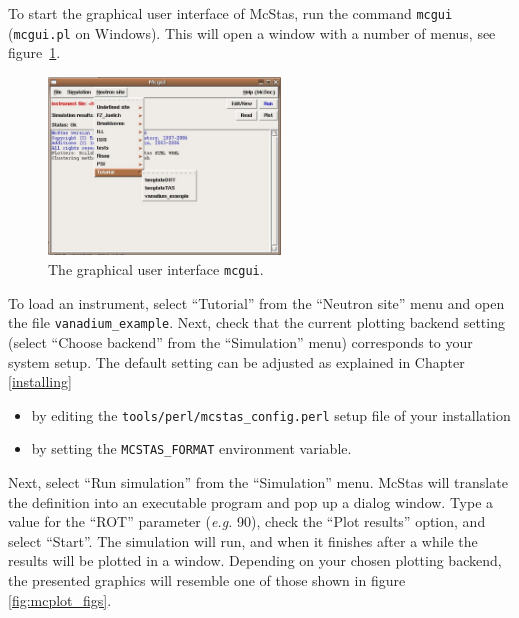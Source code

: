 To start the graphical user interface of McStas, run the command
\verb+mcgui+ (\verb+mcgui.pl+ on Windows). This will open a window
with a number of menus,
see figure~\ref{fig:mcgui}. 
\begin{figure}[htb!]
  \begin{center}
    \includegraphics[width=0.55\textwidth]{figures/mcgui.eps}
  \end{center}
\caption{The graphical user interface \texttt{mcgui}.}
\label{fig:mcgui}
\end{figure}
\label{p:neutronsite}
To load an instrument, select ``Tutorial'' from the ``Neutron site''
menu and open the file \verb+vanadium_example+. Next, check that the current plotting backend setting
(select ``Choose backend'' from the ``Simulation'' menu) corresponds
to your system setup. The default setting can be adjusted as explained in Chapter \ref{installing}
\begin{itemize}
\item{by editing
the \verb+tools/perl/mcstas_config.perl+ setup file of your
installation}
\item{by setting the \verb+MCSTAS_FORMAT+ environment
variable.}
\end{itemize} 
Next, select ``Run simulation'' from the ``Simulation'' menu.
McStas will translate the definition into an executable program and pop
up a dialog window. Type a value for the ``ROT'' parameter ({\em e.g.}
90), check the ``Plot results'' option, and select ``Start''. The
simulation will run, and when it finishes after a while the results will
be plotted in a window. Depending on your chosen plotting backend, the
presented graphics will resemble one of those shown in figure \ref{fig:mcplot_figs}.
